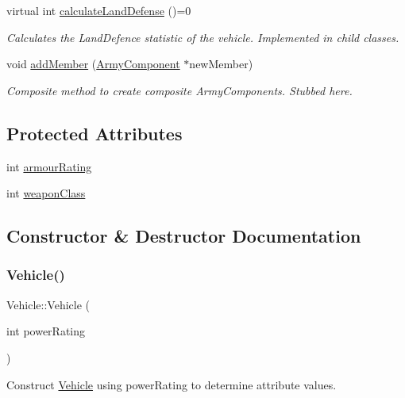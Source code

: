 \begin{DoxyCompactItemize}
virtual int \mbox{\hyperlink{class_vehicle_a155724a3ab7689c7bafb970ad47ac0df}{calculate\+Land\+Defense}} ()=0
\begin{DoxyCompactList}\small\item\em Calculates the Land\+Defence statistic of the vehicle. Implemented in child classes. \end{DoxyCompactList}\item 
void \mbox{\hyperlink{class_vehicle_ae704e3c6f06b96ab5deff0ab0ef510f5}{add\+Member}} (\mbox{\hyperlink{class_army_component}{Army\+Component}} $\ast$new\+Member)
\begin{DoxyCompactList}\small\item\em Composite method to create composite Army\+Components. Stubbed here. \end{DoxyCompactList}\end{DoxyCompactItemize}
\subsection*{Protected Attributes}
\begin{DoxyCompactItemize}
\item 
int \mbox{\hyperlink{class_vehicle_a0abf504d2db316d32a3c0ba3c2cfee18}{armour\+Rating}}
\item 
int \mbox{\hyperlink{class_vehicle_a6c4ec774dde95c7177aea0428e1dbaf4}{weapon\+Class}}
\end{DoxyCompactItemize}


\subsection{Constructor \& Destructor Documentation}
\mbox{\label{class_vehicle_aaa420b5e29e24a20c7b39cd4d7aec683}} 
\subsubsection{\texorpdfstring{Vehicle()}{Vehicle()}}
{\footnotesize\ttfamily Vehicle\+::\+Vehicle (\begin{DoxyParamCaption}\item[{int}]{power\+Rating }\end{DoxyParamCaption})}



Construct \mbox{\hyperlink{class_vehicle}{Vehicle}} using power\+Rating to determine attribute values. 

